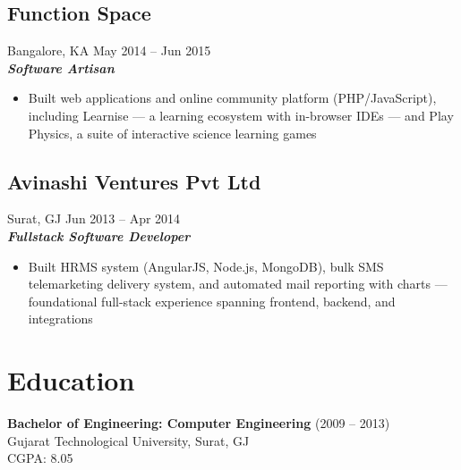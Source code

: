 \documentclass[10pt,a4paper]{article}
\begin{document}
\subsection*{\large Function Space}
\textcolor{datecolor}{Bangalore, KA \textbar May 2014 -- Jun 2015} \\
\textbf{\textit{Software Artisan}}

\begin{itemize}[leftmargin=*, nosep]
  \item Built web applications and online community platform (PHP/JavaScript), including Learnise — a learning ecosystem with in-browser IDEs — and Play Physics, a suite of interactive science learning games
\end{itemize}

\subsection*{\large Avinashi Ventures Pvt Ltd}
\textcolor{datecolor}{Surat, GJ \textbar Jun 2013 -- Apr 2014} \\
\textbf{\textit{Fullstack Software Developer}}

\begin{itemize}[leftmargin=*, nosep]
  \item Built HRMS system (AngularJS, Node.js, MongoDB), bulk SMS telemarketing delivery system, and automated mail reporting with charts — foundational full-stack experience spanning frontend, backend, and integrations
\end{itemize}

\section*{Education}
\textbf{Bachelor of Engineering: Computer Engineering} (2009 -- 2013) \\
Gujarat Technological University, Surat, GJ \\
CGPA: 8.05
\end{document}
